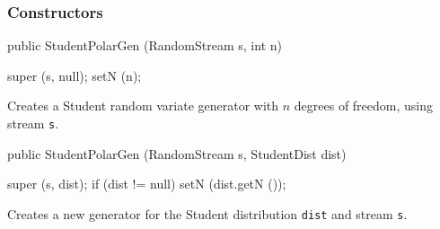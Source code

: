 \subsubsection* {Constructors}
\begin{code}

   public StudentPolarGen (RandomStream s, int n) \begin{hide} {
      super (s, null);
      setN (n);
   }\end{hide}
\end{code} 
\begin{tabb}  Creates a Student random variate generator with $n$
  degrees of freedom, using stream \texttt{s}. 
\end{tabb}
\begin{code}
 
   public StudentPolarGen (RandomStream s, StudentDist dist) \begin{hide} {
      super (s, dist);
      if (dist != null)
         setN (dist.getN ());
   }\end{hide}
\end{code}
\begin{tabb}  Creates a new generator for the Student distribution \texttt{dist}
     and stream \texttt{s}. 
\end{tabb}

